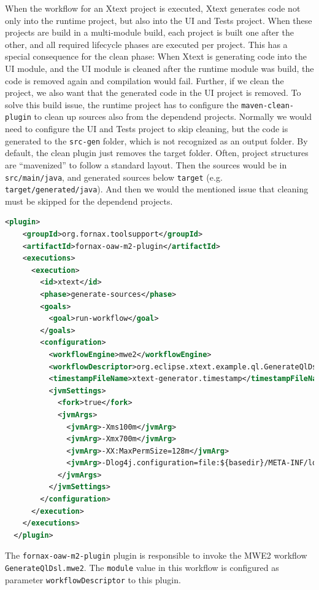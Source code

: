 When the workflow for an Xtext project is executed, Xtext generates code not
only into the runtime project, but also into the UI and Tests project. When
these projects are build in a multi-module build, each project is built one
after the other, and all required lifecycle phases are executed per project.
This has a special consequence for the clean phase: When Xtext is generating
code into the UI module, and the UI module is cleaned after the runtime module
was build, the code is removed again and compilation would fail. Further, if we
clean the project, we also want that the generated code in the UI project is
removed. To solve this build issue, the runtime project has to configure the
\texttt{maven-clean-plugin} to clean up sources also from the dependend projects.
Normally we would need to configure the UI and Tests project to skip cleaning,
but the code is generated to the \texttt{src-gen} folder, which is not recognized as an
output folder. By default, the clean plugin just removes the target folder.
Often, project structures are ``mavenized'' to follow a standard layout. Then
the sources would be in \texttt{src/main/java}, and generated sources below
\texttt{target} (e.g. \texttt{target/generated/java}). And then we would the
mentioned issue that cleaning must be skipped for the dependend projects.

\begin{lstlisting}[language=XML]
  <plugin>
    <groupId>org.fornax.toolsupport</groupId>
    <artifactId>fornax-oaw-m2-plugin</artifactId>
    <executions>
      <execution>
        <id>xtext</id>
        <phase>generate-sources</phase>
        <goals>
          <goal>run-workflow</goal>
        </goals>
        <configuration>
          <workflowEngine>mwe2</workflowEngine>
          <workflowDescriptor>org.eclipse.xtext.example.ql.GenerateQlDsl</workflowDescriptor>
          <timestampFileName>xtext-generator.timestamp</timestampFileName>
          <jvmSettings>
            <fork>true</fork>
            <jvmArgs>
              <jvmArg>-Xms100m</jvmArg>
              <jvmArg>-Xmx700m</jvmArg>
              <jvmArg>-XX:MaxPermSize=128m</jvmArg>
              <jvmArg>-Dlog4j.configuration=file:${basedir}/META-INF/log4j.properties</jvmArg>
            </jvmArgs>
          </jvmSettings>
        </configuration>
      </execution>
    </executions>
  </plugin>
\end{lstlisting}

The \texttt{fornax-oaw-m2-plugin} plugin is responsible to invoke the MWE2 workflow
\texttt{GenerateQlDsl.mwe2}. The \texttt{module} value in this workflow
is configured as parameter \texttt{workflowDescriptor} to this plugin.

